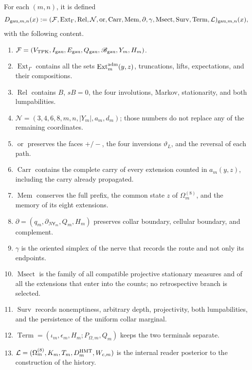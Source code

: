 For each \((m,n)\), it is defined
\begin{equation}\label{eq:gauint-d-trece}
 D_{{\rm gau},m,n}(x):=
 (\mathcal F,\operatorname{Ext}_\Gamma,\operatorname{Rel},
 \mathcal N,\operatorname{or},\operatorname{Carr},\operatorname{Mem},
 \partial,\gamma,\operatorname{Msect},\operatorname{Surv},
 \operatorname{Term},\mathcal L)_{{\rm gau},m,n}(x),
\end{equation}
with the following content.
\begin{enumerate}
 \item \(\mathcal F=(V_{\rm TPK},I_{\rm gau},E_{\rm gau},
 Q_{\rm gau},\mathscr B_{\rm gau},Y_m,H_m)\).
 \item \(\operatorname{Ext}_\Gamma\) contains all the sets
 \(\operatorname{Ext}^{\rm adm}_m(y,z)\), truncations, lifts,
 expectations, and their compositions.
 \item \(\operatorname{Rel}\) contains \(B\), \(sB=0\), the four
 involutions, Markov, stationarity, and both lumpabilities.
 \item \(\mathcal N=(3,4,6,8,m,n,|Y_m|,a_m,d_m)\); those numbers do not
 replace any of the remaining coordinates.
 \item \(\operatorname{or}\) preserves the faces \(+/-\), the four
 inversions \(\vartheta_L\), and the reversal of each path.
 \item \(\operatorname{Carr}\) contains the complete carry of every extension counted in \(a_m(y,z)\), including the carry already propagated.
 \item \(\operatorname{Mem}\) conserves the full prefix, the common
 state \(z\) of \(\Omega_m^{(8)}\), and the memory of its eight extensions.
 \item \(\partial=(q_m,\partial_{N\mathsf Y_m},Q_m,H_m)\) preserves
 collar boundary, cellular boundary, and complement.
 \item \(\gamma\) is the oriented simplex of the nerve that records the route
 and not only its endpoints.
 \item \(\operatorname{Msect}\) is the family of all compatible
 projective stationary measures and of all the extensions that
 enter into the counts; no retrospective branch is selected.
 \item \(\operatorname{Surv}\) records nonemptiness, arbitrary
 depth, projectivity, both lumpabilities, and the persistence of the
 uniform collar marginal.
 \item \(\operatorname{Term}=(\iota_m,\epsilon_m,H_m;
 P_{\Omega,m},Q_m)\) keeps the two terminals separate.
 \item \(\mathcal L=(\Omega_m^{(8)},K_m,T_m,D_m^{\rm HMT},W_{c,m})\)
 is the internal reader posterior to the construction of the history.
\end{enumerate}

